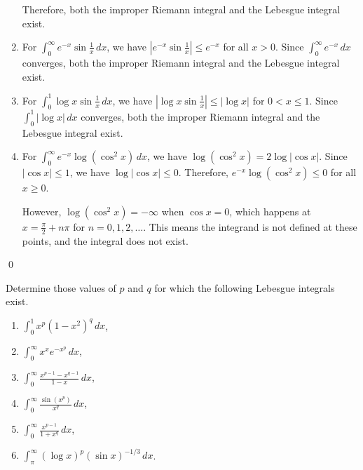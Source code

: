 \begin{enumerate}[label=(\alph*)]
    Therefore, both the improper Riemann integral and the Lebesgue integral exist.
    
    \item For $\int_{0}^{\infty} e^{-x} \sin \frac{1}{x} \, dx$, we have $|e^{-x} \sin \frac{1}{x}| \leq e^{-x}$ for all $x > 0$. Since $\int_{0}^{\infty} e^{-x} \, dx$ converges, both the improper Riemann integral and the Lebesgue integral exist.
    
    \item For $\int_{0}^{1} \log x \sin \frac{1}{x} \, dx$, we have $|\log x \sin \frac{1}{x}| \leq |\log x|$ for $0 < x \leq 1$. Since $\int_{0}^{1} |\log x| \, dx$ converges, both the improper Riemann integral and the Lebesgue integral exist.
    
    \item For $\int_{0}^{\infty} e^{-x} \log (\cos^2 x) \, dx$, we have $\log (\cos^2 x) = 2 \log |\cos x|$. Since $|\cos x| \leq 1$, we have $\log |\cos x| \leq 0$. Therefore, $e^{-x} \log (\cos^2 x) \leq 0$ for all $x \geq 0$.
    
    However, $\log (\cos^2 x) = -\infty$ when $\cos x = 0$, which happens at $x = \frac{\pi}{2} + n\pi$ for $n = 0, 1, 2, \ldots$. This means the integrand is not defined at these points, and the integral does not exist.
\end{enumerate}\qed


\begin{problembox}
Determine those values of $p$ and $q$ for which the following Lebesgue integrals exist.
\begin{enumerate}[label=(\alph*)]
    \item $\int_{0}^{1} x^p (1 - x^2)^q \, dx$,
    \item $\int_{0}^{\infty} x^x e^{-x^p} \, dx$,
    \item $\int_{0}^{\infty} \frac{x^{p-1} - x^{q-1}}{1 - x} \, dx$,
    \item $\int_{0}^{\infty} \frac{\sin(x^p)}{x^q} \, dx$,
    \item $\int_{0}^{\infty} \frac{x^{p-1}}{1 + x^q} \, dx$,
    \item $\int_{\pi}^{\infty} (\log x)^p (\sin x)^{-1/3} \, dx$.
\end{enumerate}
\end{problembox}

